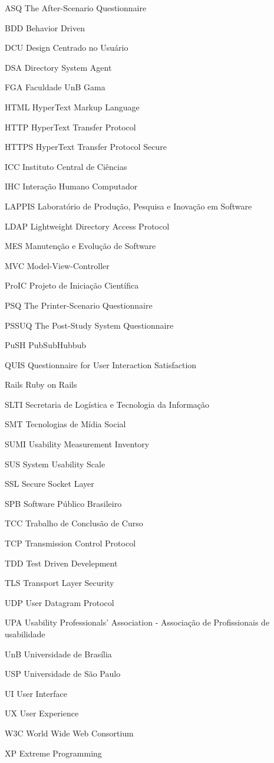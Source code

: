 \begin{siglas}
  \item[ASQ] The After-Scenario Questionnaire
  \item[BDD] Behavior Driven 
  \item[DCU] Design Centrado no Usuário
  \item[DSA] Directory System Agent
  \item[FGA] Faculdade UnB Gama
  \item[HTML] HyperText Markup Language
  \item[HTTP] HyperText Transfer Protocol
  \item[HTTPS] HyperText Transfer Protocol Secure
  \item[ICC] Instituto Central de Ciências
  \item[IHC] Interação Humano Computador
  \item[LAPPIS] Laboratório de Produção, Pesquisa e Inovação em Software
  \item[LDAP] Lightweight Directory Access Protocol
  \item[MES] Manutenção e Evolução de Software
  \item[MVC] Model-View-Controller
  \item[ProIC] Projeto de Iniciação Científica
  \item[PSQ] The Printer-Scenario Questionnaire
  \item[PSSUQ] The Post-Study System Questionnaire
  \item[PuSH] PubSubHubbub
  \item[QUIS] Questionnaire for User Interaction Satisfaction
  \item[Rails] Ruby on Rails
  \item[SLTI] Secretaria de Logística e Tecnologia da Informação
  \item[SMT] Tecnologias de Mídia Social
  \item[SUMI] Usability Measurement Inventory
  \item[SUS] System Usability Scale
  \item[SSL] Secure Socket Layer
  \item[SPB] Software Público Brasileiro
  \item[TCC] Trabalho de Conclusão de Curso
  \item[TCP] Transmission Control Protocol
  \item[TDD] Test Driven Develepment
  \item[TLS] Transport Layer Security
  \item[UDP] User Datagram Protocol
  \item[UPA] Usability Professionals' Association - Associação de Profissionais de usabilidade
  \item[UnB] Universidade de Brasília
  \item[USP] Universidade de São Paulo
  \item[UI] User Interface
  \item[UX] User Experience
  \item[W3C] World Wide Web Consortium
  \item[XP] Extreme Programming

\end{siglas}
